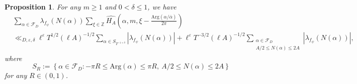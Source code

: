 \documentclass[10pt,a4paper]{amsart}
\newtheorem{proposition}{Proposition}
\newcommand{\Z}{\mathbb{Z}}
\begin{document}
\begin{proposition}\label{BoundInnerSumsSa}
For any $m\geq 1$ and $0 < \delta \leq 1$, we have 
\begin{align*}
    &\sum_{\alpha \in \mathcal{F}_{D}} \lambda_{f_{\psi}}(N(\alpha)) \sum_{\xi\in \Z} \widehat{H_A}\left( \alpha,m,\xi-\frac{\mathrm{Arg}(\alpha/\overline{\alpha})}{2\pi} \right) \\
    &\ll_{D,\varepsilon,\delta} \ell^{\varepsilon} T^{1/2} (\ell A)^{-1/2} \sum_{\alpha \in S_{T^{-1+\delta}}} |\lambda_{f_{\psi}}(N(\alpha))| + \ell^{\varepsilon} T^{-3/2} (\ell A)^{-1/2} \sum_{\substack{\alpha \in \mathcal{F}_{D} \\ A/2 \leq N(\alpha) \leq 2A}} |\lambda_{f_{\psi}}(N(\alpha))|,
\end{align*}
where $$ S_{R} := \left\{ \alpha \in \mathcal{F}_{D} : -\pi R \leq \mathrm{Arg}(\alpha) \leq \pi R, \: A/2 \leq N(\alpha) \leq 2A \right\}$$ for any $R\in (0,1)$.
\end{proposition}
\end{document}
